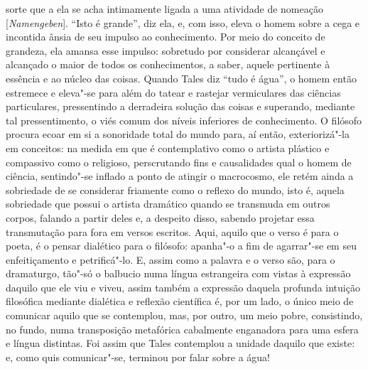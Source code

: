 sorte que a ela se acha intimamente ligada a uma atividade de nomeação
[\textit{Namengeben}]. ``Isto é grande'', diz ela, e, com isso, eleva o
homem sobre a cega e incontida ânsia de seu impulso ao conhecimento.
Por meio do conceito de grandeza, ela amansa esse impulso: sobretudo
por considerar alcançável e alcançado o maior de todos os
conhecimentos, a saber, aquele pertinente à essência e ao núcleo das
coisas. Quando Tales diz ``tudo é água'', o homem então estremece e
eleva"-se para além do tatear e rastejar vermiculares das ciências
particulares, pressentindo a derradeira solução das coisas e superando,
mediante tal pressentimento, o viés comum dos níveis inferiores de
conhecimento. O filósofo procura ecoar em si a sonoridade total do
mundo para, aí então, exteriorizá"-la em conceitos: na medida em que é
contemplativo como o artista plástico e compassivo como o religioso,
perscrutando fins e causalidades qual o homem de ciência, sentindo"-se
inflado a ponto de atingir o macrocosmo, ele retém ainda a sobriedade
de se considerar friamente como o reflexo do mundo, isto é, aquela
sobriedade que possui o artista dramático quando se transmuda em outros
corpos, falando a partir deles e, a despeito disso, sabendo projetar
essa transmutação para fora em versos escritos. Aqui, aquilo que o
verso é para o poeta, é o pensar dialético para o filósofo: apanha"-o a
fim de agarrar"-se em seu enfeitiçamento e petrificá"-lo. E, assim como a
palavra e o verso são, para o dramaturgo, tão"-só o balbucio numa língua
estrangeira com vistas à expressão daquilo que ele viu e viveu, assim
também a expressão daquela profunda intuição filosófica mediante
dialética e reflexão científica é, por um lado, o único meio de
comunicar aquilo que se contemplou, mas, por outro, um meio pobre,
consistindo, no fundo, numa transposição metafórica cabalmente
enganadora para uma esfera e língua distintas. Foi assim que Tales
contemplou a unidade daquilo que existe: e, como quis comunicar"-se,
terminou por falar sobre a água!

\sectionitem

